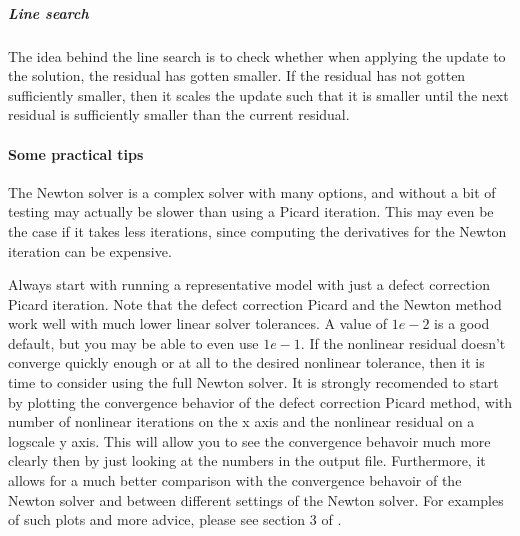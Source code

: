 \subparagraph{Line search}
The idea behind the line search is to check whether when applying the update to the 
solution, the residual has gotten smaller. If the residual has not gotten sufficiently 
smaller, then it scales the update such that it is smaller until the next residual is 
sufficiently smaller than the current residual.

\paragraph{Some practical tips}
The Newton solver is a complex solver with many options, and without a bit of testing may 
actually be slower than using a Picard iteration. This may even be the case if it takes 
less iterations, since computing the derivatives for the Newton iteration can be expensive.

Always start with running a representative model with just a defect correction Picard iteration.
Note that the defect correction Picard and the Newton method work well with much lower 
linear solver tolerances. A value of $1e-2$ is a good default, but you may be able to 
even use $1e-1$. 
If the nonlinear residual doesn't converge quickly enough or at all to the desired nonlinear 
tolerance, then it is time to consider using the full Newton solver. It is strongly 
recomended to start by plotting the convergence behavior of the defect correction Picard 
method, with number of nonlinear iterations on the x axis and the nonlinear residual on a 
logscale y axis. This will allow you to see the convergence behavoir much more clearly 
then by just looking at the numbers in the \aspect{} output file. Furthermore, it allows 
for a much better comparison with the convergence behavoir of the Newton solver and 
between different settings of the Newton solver. For examples of such plots and more advice, 
please see section 3 of \cite{FBTGS19}.